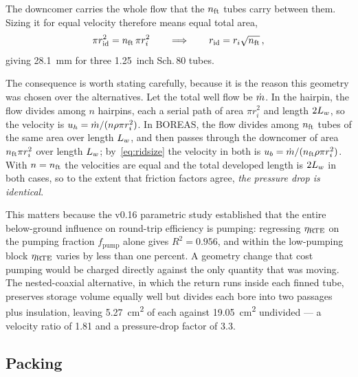 The downcomer carries the whole flow that the $n_{\mathrm{ft}}$ tubes carry between them.
Sizing it for equal velocity therefore means equal total area,
\begin{equation}
\pi r_{\mathrm{id}}^{2} = n_{\mathrm{ft}}\,\pi r_i^{2}
\qquad\Longrightarrow\qquad
r_{\mathrm{id}} = r_i\sqrt{n_{\mathrm{ft}}}\,,
\label{eq:ridsize}
\end{equation}
giving \SI{28.1}{\milli\metre} for three \SI{1.25}{inch} Sch.\,80 tubes.

The consequence is worth stating carefully, because it is the reason this
geometry was chosen over the alternatives. Let the total well flow be $\dot m$.
In the hairpin, the flow divides among $n$ hairpins, each a serial path of
area $\pi r_i^2$ and length $2L_{w}$, so the velocity is
$u_h = \dot m/(n\rho\pi r_i^{2})$. In BOREAS, the flow divides among $n_{\mathrm{ft}}$ tubes
of the same area over length $L_{w}$, and then passes through the downcomer of
area $n_{\mathrm{ft}} \pi r_i^2$ over length $L_{w}$; by~\eqref{eq:ridsize} the velocity in
both is $u_b = \dot m/(n_{\mathrm{ft}}\rho\pi r_i^{2})$. With $n = n_{\mathrm{ft}}$ the velocities are
equal and the total developed length is $2L_{w}$ in both cases, so to the extent
that friction factors agree, \emph{the pressure drop is identical}.

This matters because the v0.16 parametric study established that the entire
below-ground influence on round-trip efficiency is pumping: regressing
$\eta_{\mathrm{RTE}}$ on the pumping fraction $f_{\mathrm{pump}}$ alone gives
$R^2 = 0.956$, and within the low-pumping block $\eta_{\mathrm{RTE}}$ varies by less than
one percent. A geometry change that cost pumping would be charged directly
against the only quantity that was moving. The nested-coaxial alternative, in
which the return runs inside each finned tube, preserves storage volume
equally well but divides each bore into two passages plus insulation, leaving
\SI{5.27}{\centi\metre\squared} of each against \SI{19.05}{\centi\metre\squared}
undivided --- a velocity ratio of 1.81 and a pressure-drop factor of 3.3.

\subsection{Packing}
\label{sec:packing}

